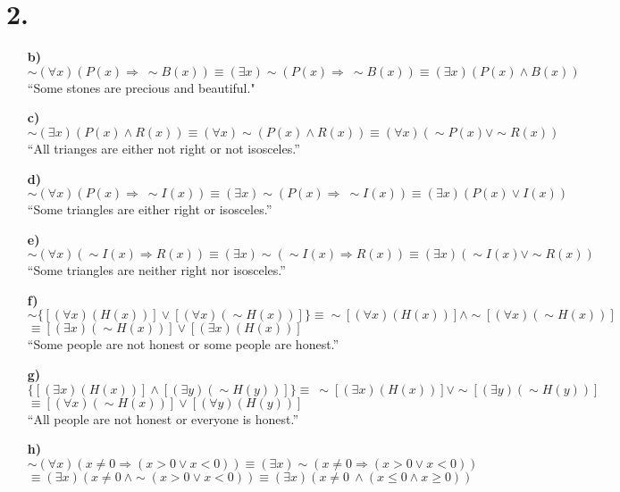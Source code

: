 \documentclass[12pt,letterpaper]{article}
\begin{document}
\section*{2.}
\begin{enumerate}[label= \textbf{\alph*)}]
	\item[\textbf{b)}] $\sim (\forall x)(P(x) \Rightarrow\ \sim B(x)) \equiv (\exists x) \sim(P(x) \Rightarrow\ \sim B(x)) \equiv (\exists x) (P(x) \land B(x))$ \\
						``Some stones are precious and beautiful." 
	\item[\textbf{c)}] $\sim (\exists x) (P(x) \land R(x)) \equiv (\forall x) \sim (P(x) \land R(x)) \equiv (\forall x) (\sim P(x) \lor \sim R(x))$\\
						``All trianges are either not right or not isosceles.'' 
	\item[\textbf{d)}] $\sim (\forall x) (P(x) \Rightarrow\ \sim I(x)) \equiv (\exists x) \sim (P(x) \Rightarrow\ \sim I(x)) \equiv (\exists x) (P(x) \lor I(x))$\\
						``Some triangles are either right or isosceles.'' 
	\item[\textbf{e)}] $\sim (\forall x) (\sim I(x) \Rightarrow R(x)) \equiv (\exists x)\sim (\sim I(x) \Rightarrow R(x)) \equiv (\exists x) (\sim I(x) \lor \sim R(x))$\\
						``Some triangles are neither right nor isosceles.'' 
	\item[\textbf{f)}] $\sim \{[(\forall x)(H(x))] \lor [(\forall x)(\sim H(x))]\} \equiv \sim[(\forall x)(H(x))] \land \sim [(\forall x)(\sim H(x))]$\\
						$\equiv [(\exists x) (\sim H(x))] \lor [(\exists x)(H(x))]$ \\
						``Some people are not honest or some people are honest.''
	\item[\textbf{g)}] $\{[(\exists x)(H(x))] \land [(\exists y)(\sim H(y))]\} \equiv \ \sim [(\exists x)(H(x))] \lor \sim [(\exists y)(\sim H(y))]$\\
						$\equiv [(\forall x)(\sim H(x))] \lor [(\forall y)(H(y))]$\\
						``All people are not honest or everyone is honest.''
	\item[\textbf{h)}] $\sim (\forall x)(x \neq 0 \Rightarrow (x > 0 \lor x < 0)) \equiv (\exists x) \sim (x \neq 0 \Rightarrow (x > 0 \lor x < 0))$\\
						$\equiv (\exists x)(x \neq 0\ \land \sim (x > 0 \lor x < 0)) \equiv (\exists x)(x \neq 0\ \land (x \leq 0 \land x \geq 0))$\\

\end{enumerate}
\end{document}
